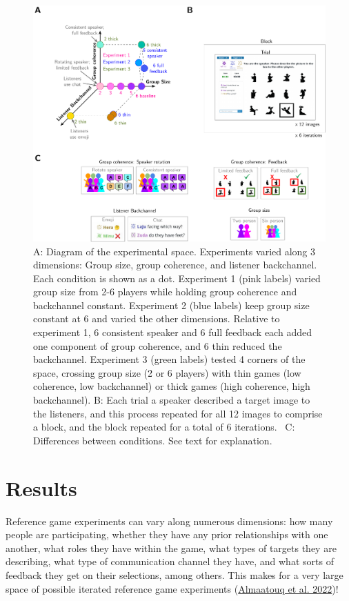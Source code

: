 \documentclass[
  english,
  a4paper,
]{article}
\begin{document}
\begin{figure}[t!]

{\centering \includegraphics[width=1\linewidth]{expt-diagram2} 

}

\caption{A: Diagram of the experimental space. Experiments varied along 3 dimensions: Group size, group coherence, and listener backchannel. Each condition is shown as a dot. Experiment 1 (pink labels) varied group size from 2-6 players while holding group coherence and backchannel constant. Experiment 2 (blue labels) keep group size constant at 6 and varied the other dimensions. Relative to experiment 1, 6 consistent speaker and 6 full feedback each added one component of group coherence, and 6 thin reduced the backchannel. Experiment 3 (green labels) tested 4 corners of the space, crossing group size (2 or 6 players) with thin games (low coherence, low backchannel) or thick games (high coherence, high backchannel).   B: Each trial a speaker described a target image to the listeners, and this process repeated for all 12 images to comprise a block, and the block repeated for a total of 6 iterations. \ C: Differences between conditions. See text for explanation.}\label{fig:diagram}
\end{figure}

\hypertarget{results}{%
\section{Results}\label{results}}

Reference game experiments can vary along numerous dimensions: how many people are participating, whether they have any prior relationships with one another, what roles they have within the game, what types of targets they are describing, what type of communication channel they have, and what sorts of feedback they get on their selections, among others. This makes for a very large space of possible iterated reference game experiments (\protect\hyperlink{ref-almaatouq2022}{Almaatouq et al. 2022})!
\end{document}
